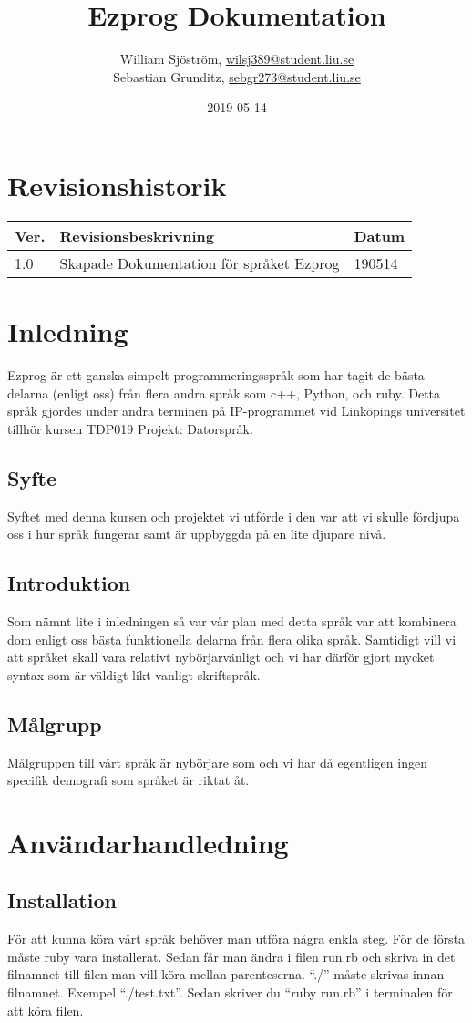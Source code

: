 \documentclass{TDP003mall}
\author{William Sjöström, \url{wilsj389@student.liu.se}\\
  Sebastian Grunditz, \url{sebgr273@student.liu.se}}
\title{Ezprog Dokumentation}
\date{2019-05-14}
\begin{document}
\projectpage
\tableofcontents
\clearpage
\section{Revisionshistorik}
\begin{table}[!h]
\begin{tabularx}{\linewidth}{|l|X|l|}
\hline
Ver. & Revisionsbeskrivning & Datum \\\hline
1.0 & Skapade Dokumentation för språket Ezprog & 190514 \\\hline
\end{tabularx}
\end{table}


\section{Inledning}
Ezprog är ett ganska simpelt programmeringsspråk som har tagit de bästa delarna (enligt oss) från flera andra språk som c++, Python, och ruby. Detta språk gjordes under andra terminen på IP-programmet vid Linköpings universitet tillhör kursen TDP019 Projekt: Datorspråk.
\subsection{Syfte}
Syftet med denna kursen och projektet vi utförde i den var att vi skulle fördjupa oss i hur språk fungerar samt är uppbyggda på en lite djupare nivå.
\subsection{Introduktion}
Som nämnt lite i inledningen så var vår plan med detta språk var att kombinera dom enligt oss bästa funktionella delarna från flera olika språk. Samtidigt vill vi att språket skall vara relativt nybörjarvänligt och vi har därför gjort mycket syntax som är väldigt likt vanligt skriftspråk.
\subsection{Målgrupp}
Målgruppen till vårt språk är nybörjare som och vi har då egentligen ingen specifik demografi som språket är riktat åt.
\clearpage
\section{Användarhandledning}
\subsection{Installation}
För att kunna köra vårt språk behöver man utföra några enkla steg. För de första måste ruby vara installerat. Sedan får man ändra i filen run.rb och skriva in det filnamnet till filen man vill köra mellan parenteserna. \enquote{./} måste skrivas innan filnamnet. Exempel “./test.txt”. Sedan skriver du “ruby run.rb” i terminalen för att köra filen.
\end{document}
